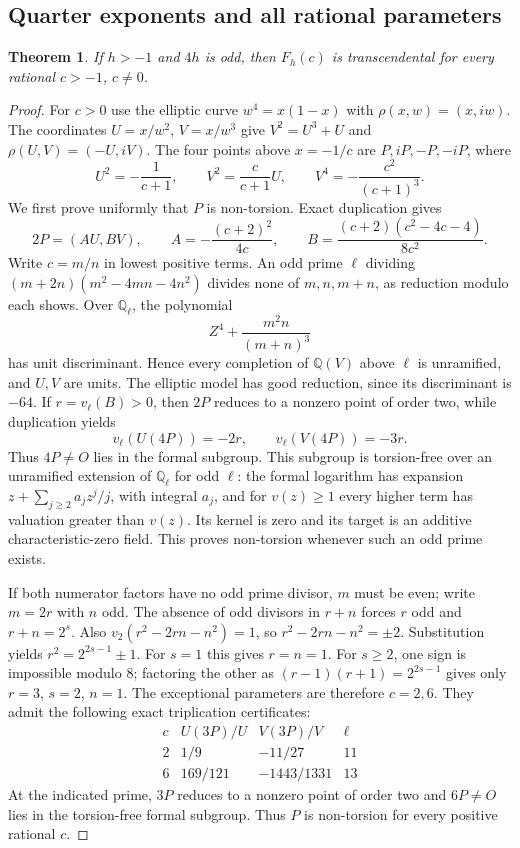 \documentclass[11pt,a4paper]{article}
\newtheorem{theorem}{Theorem}[section]
\theoremstyle{definition}
\theoremstyle{remark}
\numberwithin{equation}{section}
\begin{document}
\subsection{Quarter exponents and all rational parameters}

\begin{theorem}\label{log1-quarter}
If $h>-1$ and $4h$ is odd, then $F_h(c)$ is transcendental for every
rational $c>-1$, $c\ne0$.
\end{theorem}
\begin{proof}
For $c>0$ use the elliptic curve $w^4=x(1-x)$ with
$\rho(x,w)=(x,iw)$. The coordinates
$U=x/w^2$, $V=x/w^3$ give $V^2=U^3+U$ and
$\rho(U,V)=(-U,iV)$. The four points above $x=-1/c$ are
$P,iP,-P,-iP$, where
\[
 U^2=-\frac1{c+1},\qquad V^2=\frac c{c+1}U,
 \qquad V^4=-\frac{c^2}{(c+1)^3}.
\]
We first prove uniformly that $P$ is non-torsion. Exact duplication gives
\begin{equation}\label{log1-quarter-double}
 2P=(AU,BV),\qquad A=-\frac{(c+2)^2}{4c},\qquad
 B=\frac{(c+2)(c^2-4c-4)}{8c^2}.
\end{equation}
Write $c=m/n$ in lowest positive terms. An odd prime $\ell$ dividing
$(m+2n)(m^2-4mn-4n^2)$ divides none of $m,n,m+n$, as reduction modulo
each shows. Over $\mathbb Q_\ell$, the polynomial
\[
 Z^4+\frac{m^2n}{(m+n)^3}
\]
has unit discriminant. Hence every completion of $\mathbb Q(V)$ above
$\ell$ is unramified, and $U,V$ are units. The elliptic model has good
reduction, since its discriminant is $-64$. If $r=v_\ell(B)>0$, then
$2P$ reduces to a nonzero point of order two, while duplication yields
\[
 v_\ell(U(4P))=-2r,\qquad v_\ell(V(4P))=-3r.
\]
Thus $4P\ne O$ lies in the formal subgroup. This subgroup is torsion-free
over an unramified extension of $\mathbb Q_\ell$ for odd $\ell$:
the formal logarithm has expansion
$z+\sum_{j\ge2}a_jz^j/j$, with integral $a_j$, and for $v(z)\ge1$
every higher term has valuation greater than $v(z)$. Its kernel is zero
and its target is an additive characteristic-zero field. This proves
non-torsion whenever such an odd prime exists.

If both numerator factors have no odd prime divisor, $m$ must be even;
write $m=2r$ with $n$ odd. The absence of odd divisors in $r+n$ forces
$r$ odd and $r+n=2^s$. Also
$v_2(r^2-2rn-n^2)=1$, so $r^2-2rn-n^2=\pm2$. Substitution yields
$r^2=2^{2s-1}\pm1$. For $s=1$ this gives $r=n=1$. For $s\ge2$,
one sign is impossible modulo $8$; factoring the other as
$(r-1)(r+1)=2^{2s-1}$ gives only $r=3$, $s=2$, $n=1$.
The exceptional parameters are therefore $c=2,6$. They admit the
following exact triplication certificates:
\[
\begin{array}{c|c|c|c}
c&U(3P)/U&V(3P)/V&\ell\\\hline
2&1/9&-11/27&11\\
6&169/121&-1443/1331&13
\end{array}
\]
At the indicated prime, $3P$ reduces to a nonzero point of order two
and $6P\ne O$ lies in the torsion-free formal subgroup. Thus $P$ is
non-torsion for every positive rational $c$.


\end{proof}
\end{document}
